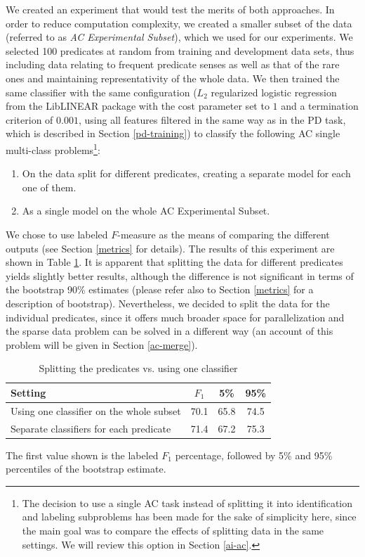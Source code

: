 \documentclass[12pt,notitlepage]{report}
\begin{document}
We created an experiment that would test the merits of both approaches. In order to reduce computation complexity, we created a smaller subset of the data (referred to as \emph{AC Experimental Subset}), which we used for our experiments. We selected 100 predicates at random from training and development data sets, thus including data relating to frequent predicate senses as well as that of the rare ones and maintaining representativity of the whole data. We then trained the same classifier with the same configuration ($L_2$ regularized logistic regression from the LibLINEAR package with the cost parameter set to $1$ and a termination criterion of $0.001$, using all features filtered in the same way as in the PD task, which is described in Section \ref{pd-training}) to classify the following AC single multi-class problems\footnote{The decision to use a single AC task instead of splitting it into identification and labeling subproblems has been made for the sake of simplicity here, since the main goal was to compare the effects of splitting data in the same settings. We will review this option in Section \ref{ai-ac}.}:
\begin{enumerate}
    \item On the data split for different predicates, creating a separate model for each one of them.
    \item As a single model on the whole AC Experimental Subset.
\end{enumerate}
We chose to use labeled $F$-measure as the means of comparing the different outputs (see Section \ref{metrics} for details). The results of this experiment are shown in Table \ref{tab:one-bag}. It is apparent that splitting the data for different predicates yields slightly better results, although the difference is not significant in terms of the bootstrap 90\% estimates (please refer also to Section \ref{metrics} for a description of bootstrap). Nevertheless, we decided to split the data for the individual predicates, since it offers much broader space for parallelization and the sparse data problem can be solved in a different way (an account of this problem will be given in Section \ref{ac-merge}).

\begin{table}[htb]\label{tab:one-bag}
\caption{Splitting the predicates vs. using one classifier}\footnotesize
\begin{center}
\begin{tabular}{|l|c|c|c|}\hline
\bf Setting & $F_1$ & \bf 5\% & \bf 95\% \\\hline
Using one classifier on the whole subset & 70.1 & 65.8 & 74.5 \\
Separate classifiers for each predicate &  71.4 & 67.2 & 75.3 \\\hline
\end{tabular}
\end{center}
The first value shown is the labeled $F_1$ percentage, followed by 5\% and 95\% percentiles of the bootstrap estimate.
\end{table}
\end{document}
